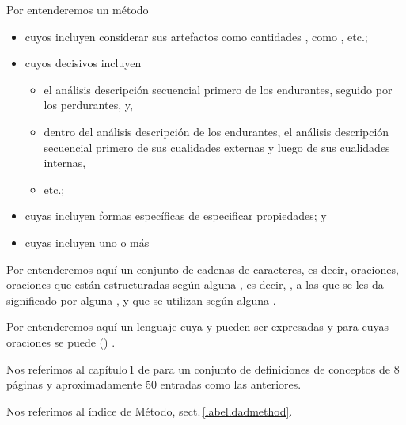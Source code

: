 \pind Por  entenderemos un método
\begin{itemize}
\item cuyos  incluyen considerar sus artefactos como %
      cantidades , como , etc.;
\item cuyos  decisivos incluyen
\begin{itemize}
\item el análisis
      \ysfchg{\&} descripción secuencial primero de los endurantes, seguido por los perdurantes,
      y,
\item dentro del análisis \ysfchg{\&} descripción de los endurantes,
      el análisis \ysfchg{\&} descripción secuencial primero de sus cualidades externas y luego de sus cualidades internas,
\item etc.;
\end{itemize}
\item cuyas  incluyen formas específicas de
       especificar propiedades; y
\item cuyas  incluyen uno o más
\end{itemize}
\mnewfoil

\noindent
\begynd
\pind Por  entenderemos aquí \nyl un conjunto de
cadenas de caracteres, es decir, oraciones,
\begynd
\pind oraciones que están estructuradas según alguna ,
      es decir, ,
\pind a las que se les da significado por alguna ,
\pind y que se utilizan según alguna . 
\afslut
\afslut

\begynd
\pind Por  entenderemos aquí un lenguaje
\begynd
\pind cuya  y  pueden ser expresadas
\pind y para cuyas oraciones se puede  %
      () . 
\afslut

\pind Nos referimos al capítulo\,1 de \cite{BjornerMonograph2020} para un conjunto de
      definiciones de conceptos de 8 páginas y aproximadamente 50 entradas como las anteriores.
      
\pind Nos referimos al índice de \textsf{Método}, sect.\,\vref{label.dadmethod}.
\afslut
      
